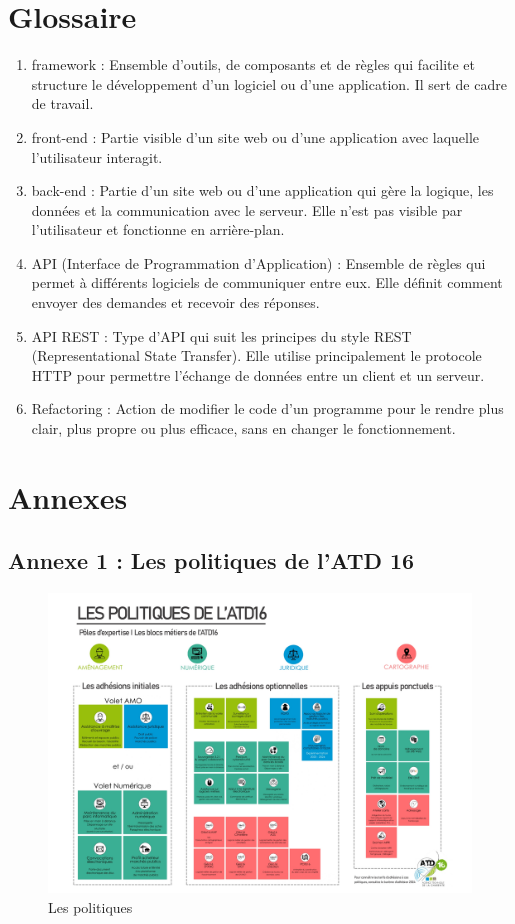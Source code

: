 \documentclass[a4paper,12pt]{report}
\begin{document}
\chapter{Glossaire}
\begin{enumerate}
    \item framework : Ensemble d'outils, de composants et de règles qui facilite et structure le développement d'un logiciel ou d'une application. Il sert de cadre de travail.
    \item front-end : Partie visible d'un site web ou d'une application avec laquelle l'utilisateur interagit.
    \item back-end : Partie d'un site web ou d'une application qui gère la logique, les données et la communication avec le serveur. Elle n'est pas visible par l'utilisateur et fonctionne en arrière-plan.
    \item API (Interface de Programmation d’Application) : Ensemble de règles qui permet à différents logiciels de communiquer entre eux. Elle définit comment envoyer des demandes et recevoir des réponses. 
    \item API REST : Type d’API qui suit les principes du style REST (Representational State Transfer). Elle utilise principalement le protocole HTTP pour permettre l’échange de données entre un client et un serveur.
    \item Refactoring : Action de modifier le code d’un programme pour le rendre plus clair, plus propre ou plus efficace, sans en changer le fonctionnement.
\end{enumerate}

\chapter{Annexes}
\newpage
\section{Annexe 1 : Les politiques de l'ATD 16}
\begin{figure}[H]
    \centering
    \includegraphics[angle=90,scale=0.4]{images_rapport/2024-Bareme-1_page-0001.jpg}
    \caption{Les politiques}
    \label{fig:politiques}
\end{figure}
\end{document}
